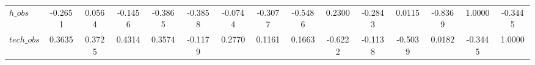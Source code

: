 \begin{center}
\begin{longtable}{lcccccccccccccc}
$h\_obs         $	 & 	          -0.2651	 & 	           0.0564	 & 	          -0.1456	 & 	          -0.3865	 & 	          -0.3858	 & 	          -0.0744	 & 	          -0.3077	 & 	          -0.5486	 & 	           0.2300	 & 	          -0.2843	 & 	           0.0115	 & 	          -0.8369	 & 	           1.0000	 & 	          -0.3445 \\ 
$tech\_obs      $	 & 	           0.3635	 & 	           0.3725	 & 	           0.4314	 & 	           0.3574	 & 	          -0.1179	 & 	           0.2770	 & 	           0.1161	 & 	           0.1663	 & 	          -0.6222	 & 	          -0.1138	 & 	          -0.5039	 & 	           0.0182	 & 	          -0.3445	 & 	           1.0000 \\ 
\end{longtable}
 \end{center}
